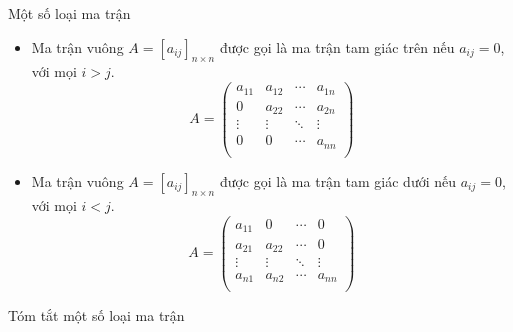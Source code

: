 \documentclass[pdf,10pt]{beamer}
\begin{document}
\begin{frame}{Một số loại ma trận}
	\begin{itemize}
		\item Ma trận vuông $A= [a_{ij}]_{n\times n}$ được gọi là ma trận tam giác trên nếu $a_{ij}=0$,  với mọi $i>j$.
		\begin{displaymath}
			A =
			\left (
			\begin{array}{cccc}
				a_{11} & a_{12} & \cdots & a_{1n} \\
				0  & a_{22} & \cdots & a_{2n} \\
				\vdots & \vdots & \ddots & \vdots \\
				0 & 0 & \cdots & a_{nn}\\
			\end{array}
			\right )
		\end{displaymath}
		\item Ma trận vuông $A= [a_{ij}]_{n\times n}$ được gọi là ma trận tam giác dưới nếu $a_{ij}=0$, với mọi $i<j$.
		\begin{displaymath}
			A =
			\left (
			\begin{array}{cccc}
				a_{11} & 0 & \cdots & 0 \\
				a_{21} & a_{22} & \cdots & 0 \\
				\vdots & \vdots & \ddots & \vdots \\
				a_{n1} & a_{n2} & \cdots & a_{nn} \\
			\end{array}
			\right )
		\end{displaymath}
	\end{itemize}
\end{frame}

\begin{frame}{Tóm tắt một số loại ma trận}
	\begin{table}
		\vspace{2mm}
		\caption{Một số loại ma trận}
		\label{tab:mat-types-1}
	\end{table}
\end{frame}
\end{document}
